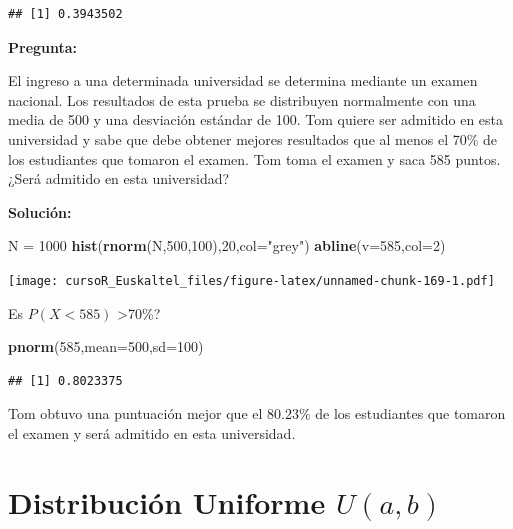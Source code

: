 \documentclass[]{book}
\newenvironment{Shaded}{\begin{snugshade}}{\end{snugshade}}
\newcommand{\KeywordTok}[1]{\textcolor[rgb]{0.13,0.29,0.53}{\textbf{#1}}}
\newcommand{\DataTypeTok}[1]{\textcolor[rgb]{0.13,0.29,0.53}{#1}}
\newcommand{\DecValTok}[1]{\textcolor[rgb]{0.00,0.00,0.81}{#1}}
\newcommand{\StringTok}[1]{\textcolor[rgb]{0.31,0.60,0.02}{#1}}
\newcommand{\NormalTok}[1]{#1}
\begin{document}
\begin{verbatim}
## [1] 0.3943502
\end{verbatim}

\textbf{Pregunta:}

El ingreso a una determinada universidad se determina mediante un examen
nacional. Los resultados de esta prueba se distribuyen normalmente con
una media de 500 y una desviación estándar de 100. Tom quiere ser
admitido en esta universidad y sabe que debe obtener mejores resultados
que al menos el 70\% de los estudiantes que tomaron el examen. Tom toma
el examen y saca 585 puntos. ¿Será admitido en esta universidad?

\textbf{Solución:}

\begin{Shaded}
\begin{Highlighting}[]
\NormalTok{N =}\StringTok{ }\DecValTok{1000}
\KeywordTok{hist}\NormalTok{(}\KeywordTok{rnorm}\NormalTok{(N,}\DecValTok{500}\NormalTok{,}\DecValTok{100}\NormalTok{),}\DecValTok{20}\NormalTok{,}\DataTypeTok{col=}\StringTok{"grey"}\NormalTok{)}
\KeywordTok{abline}\NormalTok{(}\DataTypeTok{v=}\DecValTok{585}\NormalTok{,}\DataTypeTok{col=}\DecValTok{2}\NormalTok{)}
\end{Highlighting}
\end{Shaded}

\texttt{[image: cursoR\_Euskaltel\_files/figure-latex/unnamed-chunk-169-1.pdf]}

Es \(P(X<585)\) \textgreater{}70\%?

\begin{Shaded}
\begin{Highlighting}[]
\KeywordTok{pnorm}\NormalTok{(}\DecValTok{585}\NormalTok{,}\DataTypeTok{mean=}\DecValTok{500}\NormalTok{,}\DataTypeTok{sd=}\DecValTok{100}\NormalTok{)}
\end{Highlighting}
\end{Shaded}

\begin{verbatim}
## [1] 0.8023375
\end{verbatim}

Tom obtuvo una puntuación mejor que el 80.23\% de los estudiantes que
tomaron el examen y será admitido en esta universidad.

\section{\texorpdfstring{Distribución Uniforme
\(U(a,b)\)}{Distribución Uniforme U(a,b)}}\label{distribucion-uniforme-uab}
\end{document}
